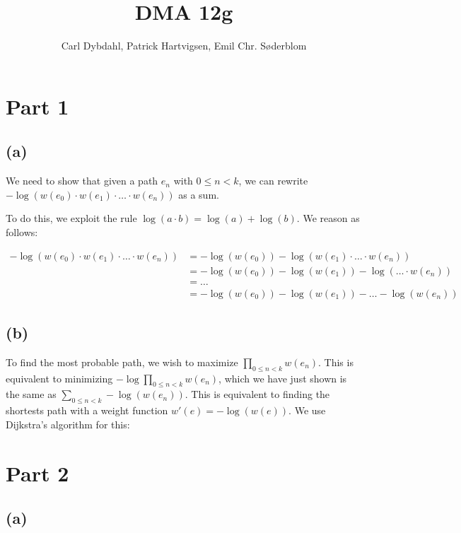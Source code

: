 \documentclass[a4paper]{article}
\title{DMA 12g}
\author{Carl Dybdahl, Patrick Hartvigsen, Emil Chr. Søderblom}
\begin{document}
\maketitle

\section*{Part 1}

\subsection*{(a)}

We need to show that given a path \(e_n\) with \(0 \le n < k\), we can rewrite \(-\log(w(e_0)\cdot w(e_1)\cdot \dots \cdot w(e_n))\) as a sum.

To do this, we exploit the rule \(\log(a\cdot b) = \log(a) + \log(b)\). We reason as follows:

\[
\begin{aligned}
-\log(w(e_0)\cdot w(e_1)\cdot \dots \cdot w(e_n)) &= -\log(w(e_0)) - \log(w(e_1)\cdot \dots \cdot w(e_n)) \\
&=  -\log(w(e_0)) - \log(w(e_1)) - \log(\dots \cdot w(e_n)) \\
&= \dots \\
&= -\log(w(e_0)) - \log(w(e_1)) - \dots - \log(w(e_n))
\end{aligned}
\]
\subsection*{(b)}

To find the most probable path, we wish to maximize \(\prod\limits_{0 \le n < k} w(e_n)\). This is equivalent to minimizing \(- \log\prod\limits_{0 \le n < k} w(e_n)\), which we have just shown is the same as \(\sum\limits_{0 \le n < k} - \log(w(e_n))\). This is equivalent to finding the shortests path with a weight function \(w'(e) = -\log(w(e))\). We use Dijkstra's algorithm for this:


\section*{Part 2}

\subsection*{(a)}
\end{document}

